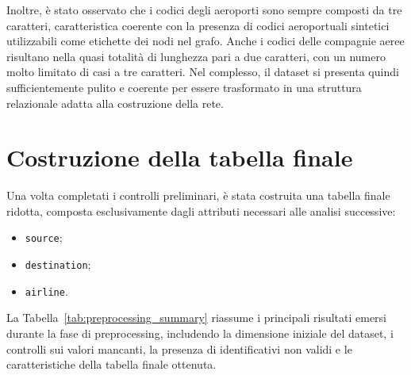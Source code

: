 Inoltre, è stato osservato che i codici degli aeroporti sono sempre composti da tre caratteri, caratteristica coerente con la presenza di codici aeroportuali sintetici utilizzabili come etichette dei nodi nel grafo. Anche i codici delle compagnie aeree risultano nella quasi totalità di lunghezza pari a due caratteri, con un numero molto limitato di casi a tre caratteri. Nel complesso, il dataset si presenta quindi sufficientemente pulito e coerente per essere trasformato in una struttura relazionale adatta alla costruzione della rete.



\section{Costruzione della tabella finale}

Una volta completati i controlli preliminari, è stata costruita una tabella finale ridotta, composta esclusivamente dagli attributi necessari alle analisi successive:
\begin{itemize}
    \item \texttt{source};
    \item \texttt{destination};
    \item \texttt{airline}.
\end{itemize}

La Tabella~\ref{tab:preprocessing_summary} riassume i principali risultati emersi durante la fase di preprocessing, includendo la dimensione iniziale del dataset, i controlli sui valori mancanti, la presenza di identificativi non validi e le caratteristiche della tabella finale ottenuta.


